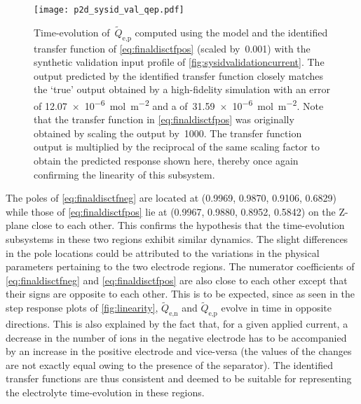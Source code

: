 \begin{figure}[!htbp]
    \centering
    \texttt{[image: p2d\_sysid\_val\_qep.pdf]}
    \caption[$\widetilde{Q}_{\text{e,p}}(t)$ outputs from  and
    identified transfer function for training profile]{%
        Time-evolution of~$\widetilde{Q}_{\text{e,p}}$ computed using the
         model  and the identified transfer function
        of \cref{eq:finaldisctfpos} (scaled by~0.001) with the synthetic
        validation input profile of \cref{fig:sysidvalidationcurrent}. The output
        predicted by the identified transfer function closely matches the `true'
        output obtained by a high-fidelity  simulation with an
         error of \SI{12.07e-6}{\mole\per\meter\squared} and a
         of~\SI{31.59e-6}{\mole\per\meter\squared}. Note that the
        transfer function in \cref{eq:finaldisctfpos} was originally obtained by
        scaling the output by~1000. The transfer function output is
        multiplied by the reciprocal of the same scaling factor to obtain the
        predicted response shown here, thereby once again confirming the
        linearity of this subsystem.
    }%
    \label{fig:tfpredQepval}
\end{figure}

The  poles of \cref{eq:finaldisctfneg} are located at (0.9969, 0.9870, 0.9106,
0.6829) while those of  \cref{eq:finaldisctfpos} lie at (0.9967, 0.9880, 0.8952,
0.5842) on the Z-plane \ie{} close to each other. This  confirms  the hypothesis
that  the time-evolution subsystems  in these  two regions  exhibit similar
dynamics. The slight differences in  the pole locations could be attributed  to
the variations in  the  physical  parameters  pertaining  to the two  electrode
regions.  The numerator coefficients  of \cref{eq:finaldisctfneg} and
\cref{eq:finaldisctfpos} are  also  close  to  each other  except  that  their
signs  are  opposite  to each   other.  This   is to   be   expected,  since
as  seen   in  the   step response   plots   of \cref{fig:linearity},
$\widetilde{Q}_{\text{e,n}}$   and $\widetilde{Q}_{\text{e,p}}$ evolve in time
in opposite directions. This is also explained by  the fact  that, for  a given
applied current,  a decrease  in the number of ions in the negative electrode
has to be accompanied by an increase in the positive electrode and vice-versa
(the values of the changes are not exactly equal owing to the presence of the
separator). The identified transfer functions are thus consistent  and deemed to
be suitable for  representing the electrolyte time-evolution in these regions.

